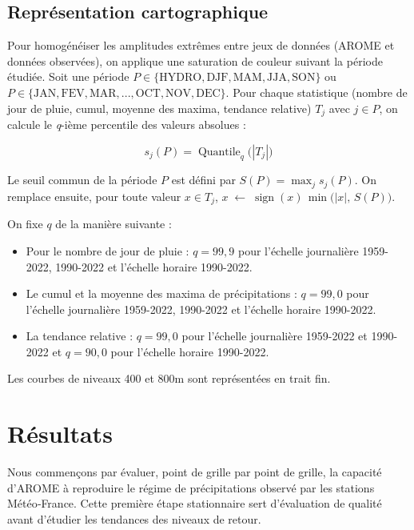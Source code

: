 \documentclass[
  article,
  nofooter,
  noheadings]{jss}
\providecommand{\tightlist}{%
  \setlength{\itemsep}{0pt}\setlength{\parskip}{0pt}}\usepackage{longtable,booktabs,array}
\begin{document}
\subsection{Représentation
cartographique}\label{repruxe9sentation-cartographique}

Pour homogénéiser les amplitudes extrêmes entre jeux de données (AROME
et données observées), on applique une saturation de couleur suivant la
période étudiée. Soit une période
\(P \in \{\text{HYDRO}, \text{DJF},\text{MAM},\text{JJA},\text{SON}\}\)
ou
\(P \in \{\text{JAN},\text{FEV},\text{MAR},\text{...},\text{OCT},\text{NOV},\text{DEC}\}\).
Pour chaque statistique (nombre de jour de pluie, cumul, moyenne des
maxima, tendance relative) \(T_j\) avec \(j \in P\), on calcule le
\emph{q}-ième percentile des valeurs absolues :

\[
s_j(P)=\operatorname{Quantile}_{q}\big(|T_j|\big)
\]

Le seuil commun de la période \(P\) est défini par
\(S(P)=\max_j s_j(P)\). On remplace ensuite, pour toute valeur
\(x\in T_j\),
\(x \;\leftarrow\; \operatorname{sign}(x)\,\min\big(|x|,\,S(P)\big)\).

On fixe \(q\) de la manière suivante :

\begin{itemize}
\tightlist
\item
  Pour le nombre de jour de pluie : \(q = 99,9\) pour l'échelle
  journalière 1959-2022, 1990-2022 et l'échelle horaire 1990-2022.
\item
  Le cumul et la moyenne des maxima de précipitations : \(q = 99,0\)
  pour l'échelle journalière 1959-2022, 1990-2022 et l'échelle horaire
  1990-2022.
\item
  La tendance relative : \(q = 99,0\) pour l'échelle journalière
  1959-2022 et 1990-2022 et \(q = 90,0\) pour l'échelle horaire
  1990-2022.
\end{itemize}

Les courbes de niveaux 400 et 800m sont représentées en trait fin.

\section{Résultats}\label{ruxe9sultats}

Nous commençons par évaluer, point de grille par point de grille, la
capacité d'AROME à reproduire le régime de précipitations observé par
les stations Météo‑France. Cette première étape stationnaire sert
d'évaluation de qualité avant d'étudier les tendances des niveaux de
retour.
\end{document}
